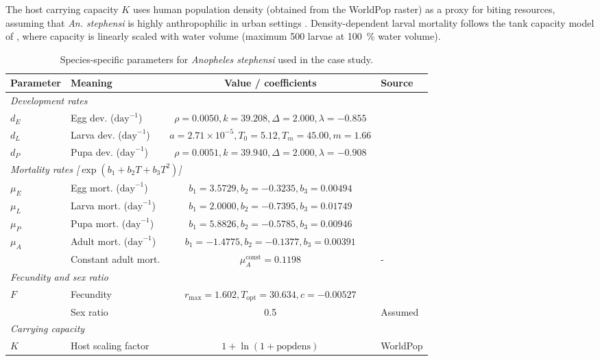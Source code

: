 \documentclass{article}
\begin{document}
The host carrying capacity $K$ uses human population density (obtained from the WorldPop raster) as a proxy for biting resources, 
assuming that \textit{An. stephensi} is highly anthropophilic in urban settings \citep{2024.TA.SDA, 2022.AH.TPI}. Density-dependent 
larval mortality follows the tank capacity model of \citet{2016.ST.OTI}, where capacity is linearly scaled with water volume 
(maximum 500 larvae at \SI{100}{\percent} water volume).

\begin{table}[!htb]
\centering
\small
\caption{Species-specific parameters for \textit{Anopheles stephensi} used in the case study.}
\label{tab:stephensi_params}
\begin{tabular}{@{}llcl@{}}
\toprule
Parameter & Meaning & Value / coefficients & Source \\ \midrule
\multicolumn{4}{l}{\textit{Development rates}} \\ \addlinespace
$d_E$ & Egg dev. ($\mathrm{day}^{-1}$) & $\rho = 0.0050, k = 39.208, \Delta = 2.000, \lambda = -0.855$ & \cite{1980.WK.HLT} \\
$d_L$ & Larva dev. ($\mathrm{day}^{-1}$) & $a = 2.71 \times 10^{-5}, T_0 = 5.12, T_m = 45.00, m = 1.66$ & \cite{2022.OC.TIT} \\
$d_P$ & Pupa dev. ($\mathrm{day}^{-1}$) & $\rho = 0.0051, k = 39.940, \Delta = 2.000, \lambda = -0.908$ & \cite{2023.NT.EOT} \\ \midrule
\multicolumn{4}{l}{\textit{Mortality rates [$\exp(b_1+b_2T+b_3T^2)$]}} \\ \addlinespace
$\mu_E$ & Egg mort. ($\mathrm{day}^{-1}$) & $b_1 = 3.5729, b_2 = -0.3235, b_3 = 0.00494$ & \cite{1980.WK.HLT} \\
$\mu_L$ & Larva mort. ($\mathrm{day}^{-1}$) & $b_1 = 2.0000, b_2 = -0.7395, b_3 = 0.01749$ & \cite{2022.OC.TIT} \\
$\mu_P$ & Pupa mort. ($\mathrm{day}^{-1}$) & $b_1 = 5.8826, b_2 = -0.5785, b_3 = 0.00946$ & \cite{2023.NT.EOT} \\
$\mu_A$ & Adult mort. ($\mathrm{day}^{-1}$) & $b_1 = -1.4775, b_2 = -0.1377, b_3 = 0.00391$ &  \\
& Constant adult mort. & $\mu_A^{\mathrm{const}} = 0.1198$ & - \\ \midrule
\multicolumn{4}{l}{\textit{Fecundity and sex ratio}} \\ \addlinespace
$F$ & Fecundity & $r_{\max}=1.602, T_{\mathrm{opt}}=30.634, c=-0.00527$ & \cite{2022.OC.TIT} \\
& Sex ratio & 0.5 & Assumed \\ \midrule
\multicolumn{4}{l}{\textit{Carrying capacity}} \\ \addlinespace
$K$ & Host scaling factor & $1 + \ln(1+\mathrm{popdens})$ & WorldPop \citet{2020.RC.MGP} \\ \bottomrule
\end{tabular}
\end{table}
\end{document}
